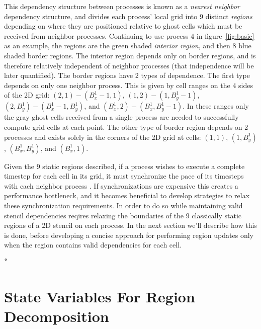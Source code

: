 This dependency structure between processes is known as a {\it nearest neighbor} dependency structure, and divides
each process' local grid into 9 distinct {\it regions} depending on where they are positioned relative
 to ghost cells which
must be received from neighbor processes.  Continuing to use process 4
in figure~\ref{fig:basic} as an example, the
regions are the green
shaded {\it interior region}, and then 8 blue shaded border regions.  The interior region depends only on border
regions, and is therefore relatively independent of neighbor processes (that independence will be later quantified).
The border regions have 2 types of dependence.  The first type depends on only one neighbor process.  This is
given by cell ranges on the 4 sides of the 2D grid: $(2,1) - (B_x^1 - 1, 1)$, $(1,2) - (1,B_y^1 - 1)$,
$(2,B_y^1) - (B_x^1 - 1, B_y^1)$, and $(B_x^1,2) - (B_x^1,B_y^1 - 1)$.  In these ranges only the gray ghost cells
 received from a single process are
needed to successfully compute grid cells at each point.  The other type of
border region depends on 2 processes and exists solely
in the corners of the 2D grid at cells: $(1,1)$, $(1,B_y^1)$, $(B_x^1,B_y^1)$,
and $(B_x^1,1)$.

Given the 9 static regions described, if a process wishes to execute a complete
timestep for each cell in its grid, it must synchronize the pace of its timesteps
with each neighbor process .
If synchronizations are expensive this creates a performance bottleneck, and
it becomes beneficial
to develop strategies to relax these synchronization requirements.
In order to do so while maintaining
valid stencil dependencies reqires relaxing the boundaries of the 9 classically
static regions of a 2D stencil
on each process.  In the next section we'll describe how this is done, before
developing a concise approach for performing region updates only when
the region contains valid dependencies for each cell.

ْ

\section{State Variables For Region Decomposition}\label{sec:state}


